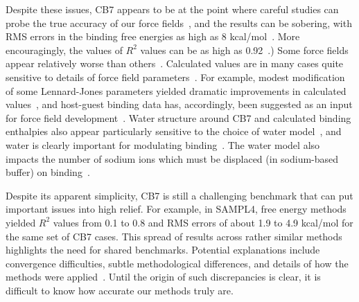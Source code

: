 \documentclass[aps,pre,twocolumn,nofootinbib,superscriptaddress,10pt, final,tightenlines]{revtex4-1}
\begin{document}
Despite these issues, CB7 appears to be at the point where careful studies can probe the true accuracy of our force fields~\cite{henriksen_computational_2015, gao_binding_2015, yin_toward_2015}, and the results can be sobering, with RMS errors in the binding free energies as high as 8 kcal/mol~\cite{henriksen_computational_2015, monroe_converging_2014}. More encouragingly, the values of $R^2$ values can be as high as 0.92~\cite{henriksen_computational_2015}.) 
Some force fields appear relatively worse than others~\cite{hsiao_prediction_2014, muddana_prediction_2012}.
Calculated values are in many cases quite sensitive to details of force field parameters~\cite{monroe_converging_2014, moghaddam_new_2011, muddana_prediction_2012}. For example, modest modification of some Lennard-Jones parameters yielded dramatic improvements in calculated values~\cite{yin_toward_2015}, and host-guest binding data has, accordingly, been suggested as an input for force field development~\cite{yin_toward_2015, henriksen_computational_2015, gao_binding_2015}.
Water structure around CB7 and calculated binding enthalpies also appear particularly sensitive to the choice of water model~\cite{rogers_role_2013, fenley_bridging_2014, gao_binding_2015}, and water is clearly important for modulating binding~\cite{nguyen_grid_2012}.
The water model also impacts the number of sodium ions which must be displaced (in sodium-based buffer) on binding~\cite{gao_binding_2015, henriksen_computational_2015}.

Despite its apparent simplicity, CB7 is still a challenging benchmark that can put important issues into high relief. For example, in SAMPL4, free energy methods yielded $R^2$ values from 0.1 to 0.8 and RMS errors of about 1.9 to 4.9 kcal/mol for the same set of CB7 cases. This spread of results across rather similar methods highlights the need for shared benchmarks. Potential explanations include convergence difficulties, subtle methodological differences, and details of how the methods were applied~\cite{muddana_sampl4_2014}. Until the origin of such discrepancies is clear, it is difficult to know how accurate our methods truly are. 
\end{document}
